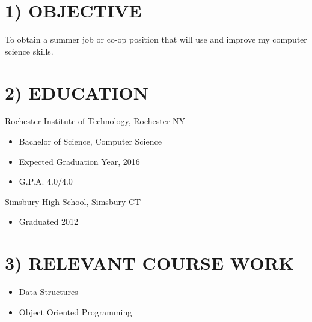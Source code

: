 \documentclass{res}
\begin{document}
                                 
\begin{resume}

\section{1) OBJECTIVE}          
    To obtain a summer job or co-op position that will use and improve my computer science skills.
 
\section{2) EDUCATION}          
	
	    Rochester Institute of Technology, Rochester NY
      \begin{itemize}
          \item Bachelor of Science, Computer Science
	        \item Expected Graduation Year, 2016
	        \item G.P.A. 4.0/4.0
      \end{itemize}
	    Simsbury High School, Simsbury CT
      \begin{itemize}
          \item Graduated 2012
		  \end{itemize}
      \vspace{-.1in}

\section{3) RELEVANT COURSE WORK}
    \begin{itemize}
      \item Data Structures 
      \item Object Oriented Programming
    \end{itemize}

 

\end{resume}
\end{document}
